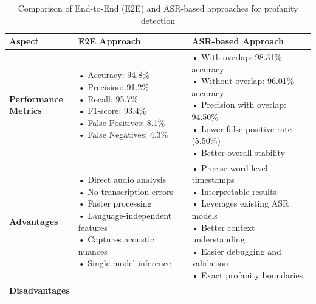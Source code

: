 \documentclass[11pt]{article}
\begin{document}
\begin{table}[H]
    \caption{Comparison of End-to-End (E2E) and ASR-based approaches for profanity detection}
    \centering
    \label{tab:approach-comparison}
    \footnotesize
    \begin{tabular}{|p{2.8cm}|p{5.5cm}|p{5.5cm}|}
        \hline
        \textbf{Aspect} & \textbf{E2E Approach} & \textbf{ASR-based Approach} \\
        \hline
        \makecell[l]{\textbf{Performance} \\ \textbf{Metrics}} & 
        \makecell[l]{
            • Accuracy: 94.8\% \\
            • Precision: 91.2\% \\
            • Recall: 95.7\% \\
            • F1-score: 93.4\% \\
            • False Positives: 8.1\% \\
            • False Negatives: 4.3\%
        } & 
        \makecell[l]{
            • With overlap: 98.31\% accuracy \\
            • Without overlap: 96.01\% accuracy \\
            • Precision with overlap: 94.50\% \\
            • Lower false positive rate (5.50\%) \\
            • Better overall stability
        } \\
        \hline
        \textbf{Advantages} & 
        \makecell[l]{
            • Direct audio analysis \\
            • No transcription errors \\
            • Faster processing \\
            • Language-independent features \\
            • Captures acoustic nuances \\
            • Single model inference
        } & 
        \makecell[l]{
            • Precise word-level timestamps \\
            • Interpretable results \\
            • Leverages existing ASR models \\
            • Better context understanding \\
            • Easier debugging and validation \\
            • Exact profanity boundaries
        } \\
        \hline
        \textbf{Disadvantages} & 

\end{tabular}
\end{table}
\end{document}
